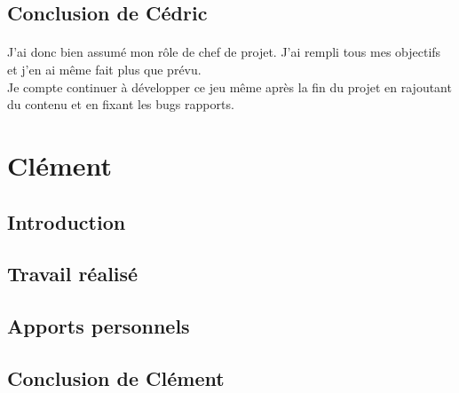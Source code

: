 \documentclass[titlepage, 13px, a4paper]{report}
\begin{document}
\subsection{Conclusion de Cédric}
\paragraph{} \hspace{0pt}
J’ai donc bien assumé mon rôle de chef de projet. J’ai rempli tous mes objectifs et 
j’en ai même fait plus que prévu. \\
Je compte continuer à développer ce jeu même après la fin du projet en rajoutant du 
contenu et en fixant les bugs rapports. \\


\newpage
\section{Clément}
\subsection{Introduction}
\paragraph{} \hspace{0pt}

\subsection{Travail réalisé}
\paragraph{} \hspace{0pt}

\subsection{Apports personnels}
\paragraph{} \hspace{0pt}

\subsection{Conclusion de Clément}
\paragraph{} \hspace{0pt}
\end{document}
